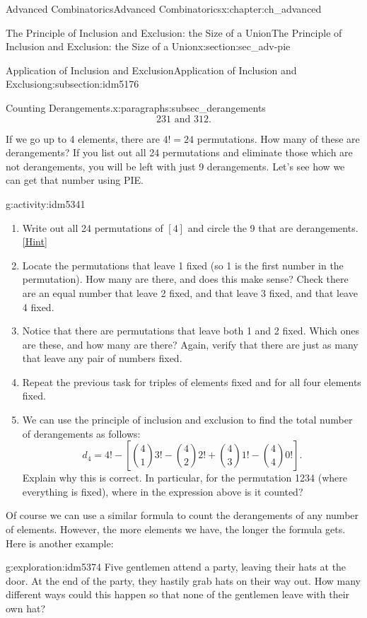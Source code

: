\documentclass[oneside,10pt,]{book}
\numberwithin{equation}{chapter}
\begin{document}
\begin{chapterptx}{Advanced Combinatorics}{}{Advanced Combinatorics}{}{}{x:chapter:ch_advanced}
\begin{sectionptx}{The Principle of Inclusion and Exclusion: the Size of a Union}{}{The Principle of Inclusion and Exclusion: the Size of a Union}{}{}{x:section:sec_adv-pie}
\begin{subsectionptx}{Application of Inclusion and Exclusion}{}{Application of Inclusion and Exclusion}{}{}{g:subsection:idm5176}
\begin{paragraphs}{Counting Derangements.}{x:paragraphs:subsec_derangements}
\begin{equation*}
231 \text{ and } 312.
\end{equation*}
%
\par
If we go up to 4 elements, there are \(4! = 24\) permutations. How many of these are derangements? If you list out all 24 permutations and eliminate those which are not derangements, you will be left with just 9 derangements. Let's see how we can get that number using PIE.%
\begin{activity}{}{g:activity:idm5341}%
\begin{enumerate}[font=\bfseries,label=(\alph*),ref=\alph*]
\item{}Write out all 24 permutations of \([4]\) and circle the 9 that are derangements.%
\space\hspace*{0pt}\hfill{\tiny\hyperlink{g:hint:idm5346-back}{[Hint]}}\item{}Locate the permutations that leave 1 fixed (so 1 is the first number in the permutation).  How many are there, and does this make sense?  Check there are an equal number that leave 2 fixed, and that leave 3 fixed, and that leave 4 fixed.%
\item{}Notice that there are permutations that leave both 1 and 2 fixed.  Which ones are these, and how many are there?  Again, verify that there are just as many that leave any pair of numbers fixed.%
\item{}Repeat the previous task for triples of elements fixed and for all four elements fixed.%
\item{}We can use the principle of inclusion and exclusion to find the total number of derangements as follows:%
\begin{equation*}
d_4 = 4! - \left[{4 \choose 1}3! - {4 \choose 2}2! + {4 \choose 3} 1! - {4 \choose 4}0!\right].
\end{equation*}
Explain why this is correct.  In particular, for the permutation 1234 (where everything is fixed), where in the expression above is it counted?%
\end{enumerate}
\end{activity}
Of course we can use a similar formula to count the derangements of any number of elements. However, the more elements we have, the longer the formula gets. Here is another example:%
\begin{exploration}{}{g:exploration:idm5374}%
Five gentlemen attend a party, leaving their hats at the door. At the end of the party, they hastily grab hats on their way out. How many different ways could this happen so that none of the gentlemen leave with their own hat?%

\end{exploration}
\end{paragraphs}
\end{subsectionptx}
\end{sectionptx}
\end{chapterptx}
\end{document}
